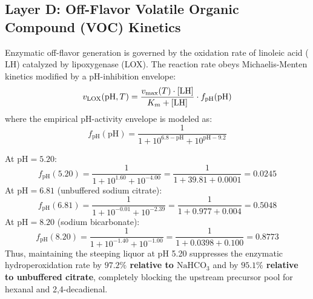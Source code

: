 \documentclass[10pt,a4paper]{article}
\begin{document}
\subsection{Layer D: Off-Flavor Volatile Organic Compound (VOC) Kinetics}
Enzymatic off-flavor generation is governed by the oxidation rate of linoleic acid ($\mathrm{LH}$) catalyzed by lipoxygenase (LOX). The reaction rate obeys Michaelis-Menten kinetics modified by a pH-inhibition envelope:
\begin{equation}
v_{\mathrm{LOX}}(\text{pH}, T) = \frac{v_{\max}(T) \cdot [\ce{LH}]}{K_m + [\ce{LH}]} \cdot f_{\mathrm{pH}}(\text{pH})
\end{equation}
where the empirical pH-activity envelope is modeled as:
\begin{equation}
f_{\mathrm{pH}}(\text{pH}) = \frac{1}{1 + 10^{6.8 - \text{pH}} + 10^{\text{pH} - 9.2}}
\end{equation}

At $\mathrm{pH } = 5.20$:
\begin{equation}
f_{\mathrm{pH}}(5.20) = \frac{1}{1 + 10^{1.60} + 10^{-4.00}} = \frac{1}{1 + 39.81 + 0.0001} = 0.0245
\end{equation}
At $\mathrm{pH } = 6.81$ (unbuffered sodium citrate):
\begin{equation}
f_{\mathrm{pH}}(6.81) = \frac{1}{1 + 10^{-0.01} + 10^{-2.39}} = \frac{1}{1 + 0.977 + 0.004} = 0.5048
\end{equation}
At $\mathrm{pH } = 8.20$ (sodium bicarbonate):
\begin{equation}
f_{\mathrm{pH}}(8.20) = \frac{1}{1 + 10^{-1.40} + 10^{-1.00}} = \frac{1}{1 + 0.0398 + 0.100} = 0.8773
\end{equation}
Thus, maintaining the steeping liquor at pH 5.20 suppresses the enzymatic hydroperoxidation rate by \textbf{$97.2\%$ relative to $\mathrm{NaHCO}_3$} and by \textbf{$95.1\%$ relative to unbuffered citrate}, completely blocking the upstream precursor pool for hexanal and 2,4-decadienal.
\end{document}
